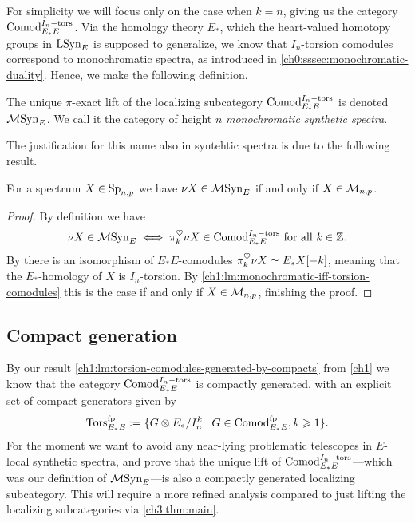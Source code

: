 For simplicity we will focus only on the case when $k=n$, giving us the category $\mathrm{Comod}_{E_*E}^{I_n-\mathrm{tors}}$. Via the homology theory $E_*$, which the heart-valued homotopy groups in $\mathrm{LSyn}_{E}$ is supposed to generalize, we know that $I_n$-torsion comodules correspond to monochromatic spectra, as introduced in \cref{ch0:sssec:monochromatic-duality}. Hence, we make the following definition. 

\begin{definition}
    The unique $\pi$-exact lift of the localizing subcategory $\mathrm{Comod}_{E_*E}^{I_n-\mathrm{tors}}$ is denoted $\mathcal{M}\mathrm{Syn}_{E}$. We call it the category of height $n$ \emph{monochromatic synthetic spectra}. 
\end{definition}

The justification for this name also in syntehtic spectra is due to the following result. 

\begin{lemma}
    \label{ch3:add:lm:mono-iff-syn-mono}
    For a spectrum $X\in \mathrm{Sp}_{n,p}$ we have $\nu X \in \mathcal{M}\mathrm{Syn}_{E}$ if and only if $X\in \mathcal{M}_{n,p}$. 
\end{lemma}
\begin{proof}
    By definition we have 
    \[\nu X \in \mathcal{M}\mathrm{Syn}_{E} \iff \pi_k^\heartsuit \nu X \in \mathrm{Comod}_{E_*E}^{I_n-\mathrm{tors}} \text{ for all } k\in \mathbb{Z}.\]
    By \cite[4.21, 4.22]{pstragowski_2022} there is an isomorphism of $E_*E$-comodules $\pi_k^\heartsuit \nu X \simeq E_{*} X[-k]$, meaning that the $E_{*}$-homology of $X$ is $I_n$-torsion. By \cref{ch1:lm:monochromatic-iff-torsion-comodules} this is the case if and only if $X\in \mathcal{M}_{n,p}$, finishing the proof. 
\end{proof}










\subsection{Compact generation}

By our result \cref{ch1:lm:torsion-comodules-generated-by-compacts} from \cref{ch1} we know that the category $\mathrm{Comod}_{E_*E}^{I_n-\mathrm{tors}}$ is compactly generated, with an explicit set of compact generators given by 
\[\mathrm{Tors}_{E_*E}^{\mathrm{fp}} := \{G\otimes E_*/I_n^k \mid G\in \mathrm{Comod}_{E_*E}^{\mathrm{fp}}, k\geqslant 1\}.\]
For the moment we want to avoid any near-lying problematic telescopes in $E$-local synthetic spectra, and prove that the unique lift of $\mathrm{Comod}_{E_*E}^{I_n-\mathrm{tors}}$---which was our definition of $\mathcal{M}\mathrm{Syn}_{E}$---is also a compactly generated localizing subcategory. This will require a more refined analysis compared to just lifting the localizing subcategories via \cref{ch3:thm:main}. 

